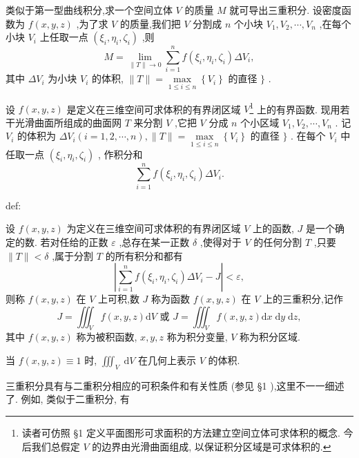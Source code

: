类似于第一型曲线积分,求一个空间立体 \(V\) 的质量 \(M\) 就可导出三重积分. 设密度函数为 \(f\left( {x,y,z}\right)\) ,为了求 \(V\) 的质量,我们把 \(V\) 分割成 \(n\) 个小块 \({V}_{1},{V}_{2},\cdots ,{V}_{n}\) ,在每个小块 \({V}_{i}\) 上任取一点 \(\left( {{\xi }_{i},{\eta }_{i},{\zeta }_{i}}\right)\) ,则
\[
M = \mathop{\lim }\limits_{{\parallel T\parallel  \rightarrow  0}}\mathop{\sum }\limits_{{i = 1}}^{n}f\left( {{\xi }_{i},{\eta }_{i},{\zeta }_{i}}\right) \Delta {V}_{i},
\]
其中 \(\Delta {V}_{i}\) 为小块 \({V}_{i}\) 的体积, \(\parallel T\parallel  = \mathop{\max }\limits_{{1 \leq  i \leq  n}}\left\{  {V}_{i}\right\}\) 的直径 \(\}\) .

设 \(f\left( {x,y,z}\right)\) 是定义在三维空间可求体积的有界闭区域 \({V}\)\footnote{读者可仿照 §1 定义平面图形可求面积的方法建立空间立体可求体积的概念. 今后我们总假定 \(V\) 的边界由光滑曲面组成, 以保证积分区域是可求体积的.} 上的有界函数. 现用若干光滑曲面所组成的曲面网 \(T\) 来分割 \(V\) ,它把 \(V\) 分成 \(n\) 个小区域 \({V}_{1},{V}_{2},\cdots ,{V}_{n}\) . 记 \({V}_{i}\) 的体积为 \(\Delta {V}_{i}\left( {i = 1,2,\cdots ,n}\right) ,\parallel T\parallel  = \mathop{\max }\limits_{{1 \leq  i \leq  n}}\left\{  {V}_{i}\right\}\) 的直径 \(\}\) . 在每个 \({V}_{i}\) 中任取一点 \(\left( {{\xi }_{i},{\eta }_{i},{\zeta }_{i}}\right)\) , 作积分和
\[
\mathop{\sum }\limits_{{i = 1}}^{n}f\left( {{\xi }_{i},{\eta }_{i},{\zeta }_{i}}\right) \Delta {V}_{i}.
\]
\begin{definition}{}{def:}

\end{definition}
设 \(f\left( {x,y,z}\right)\) 为定义在三维空间可求体积的有界闭区域 \(V\) 上的函数, \(J\) 是一个确定的数. 若对任给的正数 \(\varepsilon\) ,总存在某一正数 \(\delta\) ,使得对于 \(V\) 的任何分割 \(T\) ,只要 \(\parallel T\parallel  < \delta\) ,属于分割 \(T\) 的所有积分和都有
\[
\left| {\mathop{\sum }\limits_{{i = 1}}^{n}f\left( {{\xi }_{i},{\eta }_{i},{\zeta }_{i}}\right) \Delta {V}_{i} - J}\right|  < \varepsilon ,
\]
则称 \(f\left( {x,y,z}\right)\) 在 \(V\) 上可积,数 \(J\) 称为函数 \(f\left( {x,y,z}\right)\) 在 \(V\) 上的三重积分,记作
\[
J = {\iiint }_{V}f\left( {x,y,z}\right) \mathrm{d}V\text{ 或 }J = {\iiint }_{V}f\left( {x,y,z}\right) \mathrm{d}x\mathrm{\;d}y\mathrm{\;d}z,
\]
其中 \(f\left( {x,y,z}\right)\) 称为被积函数, \(x,y,z\) 称为积分变量, \(V\) 称为积分区域.

当 \(f\left( {x,y,z}\right)  \equiv  1\) 时, \({\iiint }_{V}\mathrm{\;d}V\) 在几何上表示 \(V\) 的体积.

三重积分具有与二重积分相应的可积条件和有关性质 (参见 §1 ),这里不一一细述了. 例如, 类似于二重积分, 有

